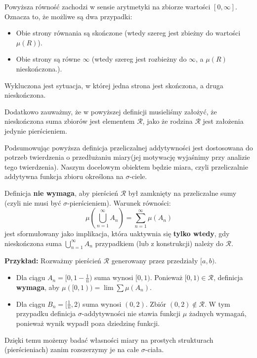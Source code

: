 \begin{remark}
	Powyższa równość zachodzi w sensie arytmetyki na zbiorze wartości $[0,\infty]$. Oznacza to, że możliwe są dwa przypadki: 
\begin{itemize} 
	\item Obie strony równania są skończone (wtedy szereg jest zbieżny do wartości $\mu\left( R \right) $). 
	\item Obie strony są równe $\infty$ (wtedy szereg jest rozbieżny do $\infty$, a $\mu\left( R \right) $ nieskończona.). 
\end{itemize}

Wykluczona jest sytuacja, w której jedna strona jest skończona, a druga nieskończona.

Dodatkowo zauważmy, że w powyższej definicji musieliśmy założyć, że nieskończona suma zbiorów jest elementem $\mathcal{R}$, jako że rodzina $\mathcal{R}$ jest założenia jedynie pierścieniem. 

	Podsumowując powyższa definicja przeliczalnej addytywności jest dostosowana do potrzeb twierdzenia o przedłużaniu miary(jej motywację wyjaśnimy przy analizie tego twierdzenia). Naszym docelowym obiektem będzie miara, czyli przeliczalnie addytywna funkcja zbioru określona na $\sigma$-ciele. 
\end{remark} 
\begin{remark}
    Definicja \textbf{nie wymaga}, aby pierścień $\mathcal{R}$ był zamknięty na przeliczalne sumy (czyli nie musi być $\sigma$-pierścieniem). Warunek równości:
    \[
    \mu \left( \bigcup_{n=1}^{\infty} A_{n}\right) = \sum_{n=1}^{\infty}\mu \left( A_{n} \right)
    \]
    jest sformułowany jako implikacja, która uaktywnia się \textbf{tylko wtedy}, gdy nieskończona suma $\bigcup_{n=1}^{\infty} A_{n}$ przypadkiem (lub z konstrukcji) należy do $\mathcal{R}$.

    \textbf{Przykład:}
    Rozważmy pierścień $\mathcal{R}$ generowany przez przedziały $[a, b)$.
    \begin{itemize}
        \item Dla ciągu $A_n = [0, 1 - \frac{1}{n})$ suma wynosi $[0, 1)$. Ponieważ $[0, 1) \in \mathcal{R}$, definicja \textbf{wymaga}, aby $\mu([0, 1)) = \lim \sum \mu(A_n)$.
        \item Dla ciągu $B_n = [\frac{1}{n}, 2)$ suma wynosi $(0, 2)$. Zbiór $(0, 2) \notin \mathcal{R}$. W tym przypadku definicja $\sigma$-addytywności nie stawia funkcji $\mu$ żadnych wymagań, ponieważ wynik wypadł poza dziedzinę funkcji.
    \end{itemize}
    Dzięki temu możemy badać własności miary na prostych strukturach (pierścieniach) zanim rozszerzymy je na całe $\sigma$-ciała.
\end{remark}

